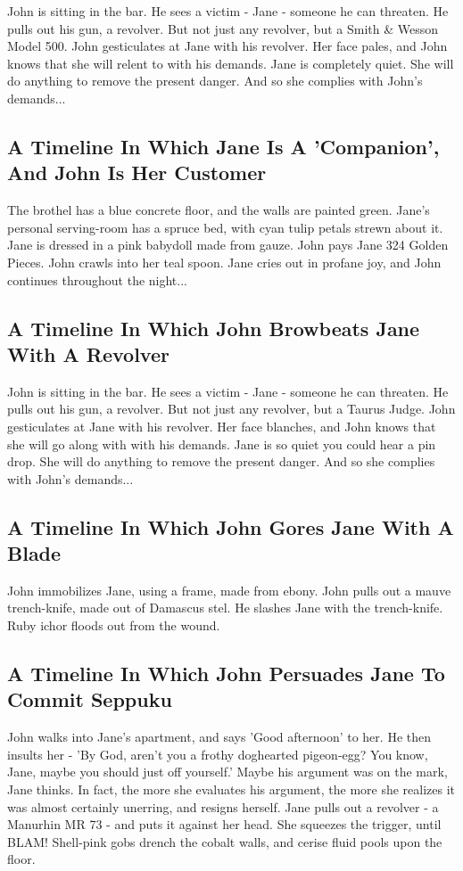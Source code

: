 \documentclass{article}
\begin{document}
John is sitting in the bar.
He sees a victim {-} Jane {-} someone he can threaten. He pulls out his gun, a revolver.
But not just any revolver, but a Smith \& Wesson Model 500.
John gesticulates at Jane with his revolver. Her face pales, and John knows that she will relent to with his demands.
Jane is completely quiet. She will do anything to remove the present danger. And so she complies with John's demands...
\subsection{A Timeline In Which Jane Is A 'Companion', And John Is Her Customer}


The brothel has a blue concrete floor, and the walls are painted green.
Jane's personal serving{-}room has a spruce bed, with cyan tulip petals strewn about it.
Jane is dressed in a pink babydoll made from gauze.
John pays Jane 324 Golden Pieces.
John crawls into her teal spoon.
Jane cries out in profane joy, and John continues throughout the night...
\subsection{A Timeline In Which John Browbeats Jane With A Revolver}


John is sitting in the bar.
He sees a victim {-} Jane {-} someone he can threaten. He pulls out his gun, a revolver.
But not just any revolver, but a Taurus Judge.
John gesticulates at Jane with his revolver. Her face blanches, and John knows that she will go along with with his demands.
Jane is so quiet you could hear a pin drop. She will do anything to remove the present danger. And so she complies with John's demands...
\subsection{A Timeline In Which John Gores Jane With A Blade}


John immobilizes Jane, using a frame, made from ebony.
John pulls out a mauve trench{-}knife, made out of Damascus stel.
He slashes Jane with the trench{-}knife.
Ruby ichor floods out from the wound.
\subsection{A Timeline In Which John Persuades Jane To Commit Seppuku}


John walks into Jane's apartment, and says 'Good afternoon' to her.
He then insults her {-} 'By God, aren't you a frothy doghearted pigeon{-}egg?
You know, Jane, maybe you should just off yourself.'
Maybe his argument was on the mark, Jane thinks.
In fact, the more she evaluates his argument, the more she realizes it was almost certainly unerring, and resigns herself.
Jane pulls out a revolver {-} a Manurhin MR 73 {-} and puts it against her head.
She squeezes the trigger, until BLAM!
Shell{-}pink gobs drench the cobalt walls, and cerise fluid pools upon the floor.
\end{document}
